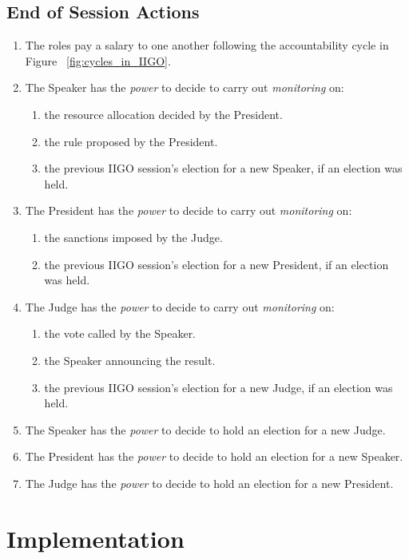\subsection{End of Session Actions}
\begin{enumerate}
    \item The roles pay a salary to one another following the accountability cycle in Figure~ \ref{fig:cycles_in_IIGO}.
    \item The Speaker has the \emph{power} to decide to carry out \emph{monitoring} on: 
    \begin{enumerate}
    \item the resource allocation decided by the President.
    \item the rule proposed by the President.
    \item the previous IIGO session's election for a new Speaker, if an election was held.
    \end{enumerate}
    \item The President has the \emph{power} to decide to carry out \emph{monitoring} on:
    \begin{enumerate}
        \item the sanctions imposed by the Judge.
        \item the previous IIGO session's election for a new President, if an election was held.
    \end{enumerate}
    \item The Judge has the \emph{power} to decide to carry out \emph{monitoring} on:
    \begin{enumerate}
        \item the vote called by the Speaker.
        \item the Speaker announcing the result.
        \item the previous IIGO session's election for a new Judge, if an election was held.
    \end{enumerate}
    \item The Speaker has the \emph{power} to decide to hold an election for a new Judge.
    \item The President has the \emph{power} to decide to hold an election for a new Speaker.
    \item The Judge has the \emph{power} to decide to hold an election for a new President.
\end{enumerate}

\section{Implementation} %

